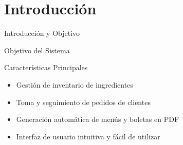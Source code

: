 \documentclass[12pt]{beamer}
\begin{document}
\section{Introducción}
\begin{frame}{Introducción y Objetivo}
  \begin{block}{Objetivo del Sistema}
  \end{block}

  \pause\begin{alertblock}{Características Principales}
    \begin{itemize}[<+->]
      \item \alert{Gestión de inventario} de ingredientes
      \item \alert{Toma y seguimiento} de pedidos de clientes
      \item \alert{Generación automática} de menús y boletas en PDF
      \item Interfaz de usuario \alert{intuitiva} y fácil de utilizar
    \end{itemize}
  \end{alertblock}
\end{frame}
\end{document}

